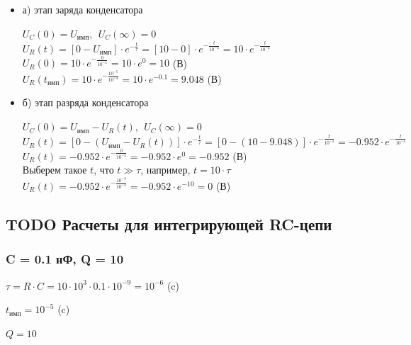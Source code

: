 \begin{itemize}
\item[] а) этап заряда конденсатора

		$U_C(0)	= U_\text{имп},\ \ U_C(\infty) = 0$\\		
		$U_R(t) = [0 - U_\text{имп}] \cdot e^{-\frac{t}{\tau}} = [10 - 0] \cdot e^{-\frac{t}{10^{-4}}} = 10 \cdot e^{-\frac{t}{10^{-4}}}$\\
		$U_R(0) = 10 \cdot e^{-\frac{0}{10^{-4}}} = 10 \cdot e^0 = 10$ (В)\\
		$U_R(t_\text{имп}) = 10 \cdot e^{-\frac{10^{-5}}{10^{-4}}} = 10 \cdot e^{-0.1} = 9.048$ (В)\\

\item[] б) этап разряда конденсатора
		
		$U_C(0)	= U_\text{имп} - U_R(t),\ \ U_C(\infty) = 0$\\
		$U_R(t) = [0 - (U_\text{имп} - U_R(t))] \cdot e^{-\frac{t}{\tau}} = [0 - (10 - 9.048)] \cdot e^{-\frac{t}{10^{-4}}} = -0.952 \cdot e^{-\frac{t}{10^{-4}}}$\\
		$U_R(t) = -0.952 \cdot e^{-\frac{0}{10^{-4}}} = -0.952 \cdot e^0 = -0.952$ (В)\\
		Выберем такое $t$, что $t \gg \tau$, например, $t = 10 \cdot \tau$ \\
		$U_R(t) = -0.952 \cdot e^{-\frac{10^{-3}}{10^{-4}}} = -0.952 \cdot e^{-10} = 0$ (В)\\
		
\end{itemize}

\subsection{TODO Расчеты для интегрирующей RC-цепи}

\subsubsection{C = 0.1 нФ, Q = 10}

		$\tau = R \cdot C = 10 \cdot 10^3 \cdot 0.1 \cdot 10^{-9} = 10^{-6}$ (c)
		
		$t_\text{имп} = 10^{-5}$ (c)
		
		$Q = 10$		
		
